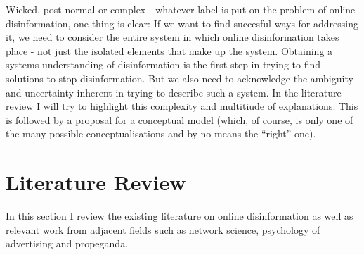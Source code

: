 \documentclass[10pt,a4paper]{article}
\begin{document}
Wicked, post-normal or complex - whatever label is put on the problem of online disinformation, one thing is clear: If we want to find succesful ways for addressing it, we need to consider the entire system in which online disinformation takes place - not just the isolated elements that make up the system. Obtaining a systems understanding of disinformation is the first step in trying to find solutions to stop disinformation. But we also need to acknowledge the ambiguity and uncertainty inherent in trying to describe such a system. In the literature review I will try to highlight this complexity and multitiude of explanations. This is followed by a proposal for a conceptual model (which, of course, is only one of the many possible conceptualisations and by no means the ``right'' one). 




\section{Literature Review}
In this section I review the existing literature on online disinformation as well as relevant work from adjacent fields such as network science, psychology of advertising and propeganda. \\
\end{document}
